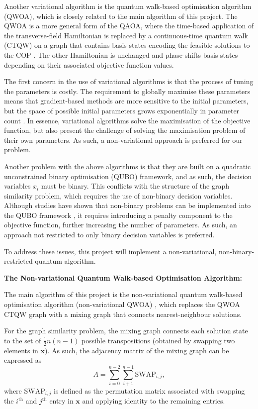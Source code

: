 Another variational algorithm is the quantum walk-based optimisation algorithm (QWOA), which is closely related to the main algorithm of this project. The QWOA is a more general form of the QAOA, where the time-based application of the transverse-field Hamiltonian is replaced by a continuous-time quantum walk (CTQW) on a graph that contains basis states encoding the feasible solutions to the COP \cite{QWOA}. The other Hamiltonian is unchanged and phase-shifts basis states depending on their associated objective function values.

The first concern in the use of variational algorithms is that the process of tuning the parameters is costly. The requirement to globally maximise these parameters means that gradient-based methods are more sensitive to the initial parameters, but the space of possible initial parameters grows exponentially in parameter count \cite{QAOA-optimiser}. In essence, variational algorithms solve the maximisation of the objective function, but also present the challenge of solving the maximisation problem of their own parameters. As such, a non-variational approach is preferred for our problem.

Another problem with the above algorithms is that they are built on a quadratic unconstrained binary optimisation (QUBO) framework, and as such, the decision variables $x_{i}$ must be binary. This conflicts with the structure of the graph similarity problem, which requires the use of non-binary decision variables. Although studies have shown that non-binary problems can be implemented into the QUBO framework \cite{QUBO-traveling}, it requires introducing a penalty component to the objective function, further increasing the number of parameters.  As such, an approach not restricted to only binary decision variables is preferred.

To address these issues, this project will implement a non-variational, non-binary-restricted quantum algorithm.

\textbf{The Non-variational Quantum Walk-based Optimisation Algorithm:}

The main algorithm of this project is the non-variational quantum walk-based optimisation algorithm (non-variational QWOA) \cite{bennett2024nonvariational}, which replaces the QWOA CTQW graph with a mixing graph that connects nearest-neighbour solutions.

For the graph similarity problem, the mixing graph connects each solution state to the set of $\frac{1}{2}n(n-1)$ possible transpositions (obtained by swapping two elements in $\mathbf{x}$). As such, the adjacency matrix of the mixing graph can be expressed as
$$
A = \sum_{i=0}^{n-2} \sum_{i+1}^{n-1} \text{SWAP}_{i,j},
$$
where $\text{SWAP}_{i,j}$ is defined as the permutation matrix associated with swapping the $i^{\text{th}}$ and $j^{\text{th}}$ entry in $\mathbf{x}$ and applying identity to the remaining entries.

